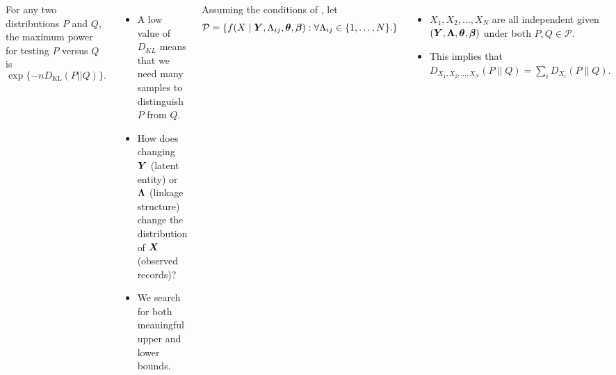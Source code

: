 \documentclass[a0paper,portrait,margin=0pt, colspace=24pt,subcolspace=0pt,blockverticalspace=36pt,innermargin=50pt]{tikzposter}
\begin{document}
\begin{columns}
{For any two distributions $P$ and $Q$, the maximum power for testing $P$ versus $Q$ is $$\exp\{-n D_{\text{KL}}(P || Q)\}.$$ 

\begin{itemize}
\item A low value of $D_{KL}$ means that we need many samples to distinguish $P$ from $Q.$

\item How  does changing $\boldsymbol{Y}$ (latent entity) or $\boldsymbol{\Lambda}$ (linkage structure) change the distribution of $\bm{X}$ (observed records)? 

\item We search for both meaningful upper and lower bounds. 

\end{itemize}

\vspace*{1em}

Assuming the conditions of \cite{steorts14smered, steorts15entity}, 
let $$\mathcal{P} = \left\{f(X\mid \bY, \Lambda_{ij}, \bm{\theta}, \bm{\beta}): 
 \forall \Lambda_{ij} \in \{ 1, \ldots, N \}.\right\}$$

\begin{itemize}
\item  $X_1,X_2,\ldots,X_N$ are all independent given $(\boldsymbol{Y},\boldsymbol{\Lambda}, \bm{\theta}, \bm{\beta})$ under both $P, Q \in \mathcal{P}.$ 
\item This implies that  $D_{X_1, X_2, \ldots, X_N} (P \| Q) = \sum_i D_{X_i}(P \| Q).$
\end{itemize} 

	


	}
	




		
	
	
%
%
%
%
\end{columns}
\end{document}
